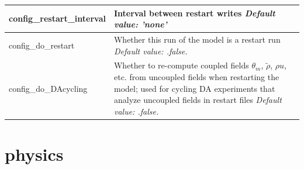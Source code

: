 \documentclass[11pt]{report}
\begin{document}
{\small
\begin{longtable}{|p{2.0in} |p{4.25in}|}
 \hline
   config\_restart\_interval & Interval between restart writes \newline 
   {\em Default value: 'none'} \\ \hline
 
   config\_do\_restart & Whether this run of the model is a restart run \newline 
   {\em Default value: .false.} \\ \hline
 
   config\_do\_DAcycling & Whether to re-compute coupled fields $\theta_m$, $\tilde\rho$, $\rho u$,  etc. from uncoupled fields when restarting the model; used for cycling DA experiments that analyze uncoupled fields in restart files \newline 
   {\em Default value: .false.} \\ \hline   
\end{longtable}
}

\section{physics}
\end{document}
